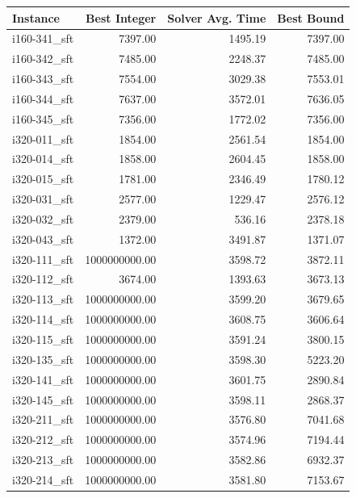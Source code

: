 \begin{tabular}{lrrr}
\toprule
Instance &  Best Integer &  Solver Avg. Time &  Best Bound \\
\midrule
i160-341\_sft &       7397.00 &           1495.19 &     7397.00 \\
i160-342\_sft &       7485.00 &           2248.37 &     7485.00 \\
i160-343\_sft &       7554.00 &           3029.38 &     7553.01 \\
i160-344\_sft &       7637.00 &           3572.01 &     7636.05 \\
i160-345\_sft &       7356.00 &           1772.02 &     7356.00 \\
i320-011\_sft &       1854.00 &           2561.54 &     1854.00 \\
i320-014\_sft &       1858.00 &           2604.45 &     1858.00 \\
i320-015\_sft &       1781.00 &           2346.49 &     1780.12 \\
i320-031\_sft &       2577.00 &           1229.47 &     2576.12 \\
i320-032\_sft &       2379.00 &            536.16 &     2378.18 \\
i320-043\_sft &       1372.00 &           3491.87 &     1371.07 \\
i320-111\_sft & 1000000000.00 &           3598.72 &     3872.11 \\
i320-112\_sft &       3674.00 &           1393.63 &     3673.13 \\
i320-113\_sft & 1000000000.00 &           3599.20 &     3679.65 \\
i320-114\_sft & 1000000000.00 &           3608.75 &     3606.64 \\
i320-115\_sft & 1000000000.00 &           3591.24 &     3800.15 \\
i320-135\_sft & 1000000000.00 &           3598.30 &     5223.20 \\
i320-141\_sft & 1000000000.00 &           3601.75 &     2890.84 \\
i320-145\_sft & 1000000000.00 &           3598.11 &     2868.37 \\
i320-211\_sft & 1000000000.00 &           3576.80 &     7041.68 \\
i320-212\_sft & 1000000000.00 &           3574.96 &     7194.44 \\
i320-213\_sft & 1000000000.00 &           3582.86 &     6932.37 \\
i320-214\_sft & 1000000000.00 &           3581.80 &     7153.67 \\

\end{tabular}
